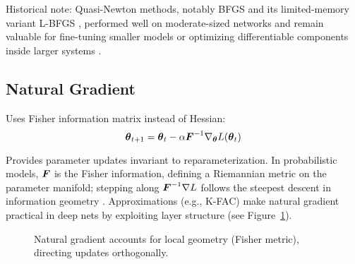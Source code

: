 Historical note: Quasi-Newton methods, notably BFGS and its limited-memory variant L-BFGS \cite{LiuNocedal1989}, performed well on moderate-sized networks and remain valuable for fine-tuning smaller models or optimizing differentiable components inside larger systems \cite{GoodfellowEtAl2016,Bishop2006}.

\subsection{Natural Gradient}

Uses Fisher information matrix instead of Hessian:
\begin{equation}
\boldsymbol{\theta}_{t+1} = \boldsymbol{\theta}_t - \alpha \boldsymbol{F}^{-1} \nabla_{\boldsymbol{\theta}} L(\boldsymbol{\theta}_t)
\end{equation}

Provides parameter updates invariant to reparameterization. In probabilistic models, \(\boldsymbol{F}\) is the Fisher information, defining a Riemannian metric on the parameter manifold; stepping along \(\boldsymbol{F}^{-1}\nabla L\) follows the steepest descent in information geometry \cite{Amari1998}. Approximations (e.g., K-FAC) make natural gradient practical in deep nets by exploiting layer structure (see Figure~\ref{fig:natural-gradient}).

\begin{figure}[h]
\centering
{}
\caption{Natural gradient accounts for local geometry (Fisher metric), directing updates orthogonally.}
\label{fig:natural-gradient}
\end{figure}

